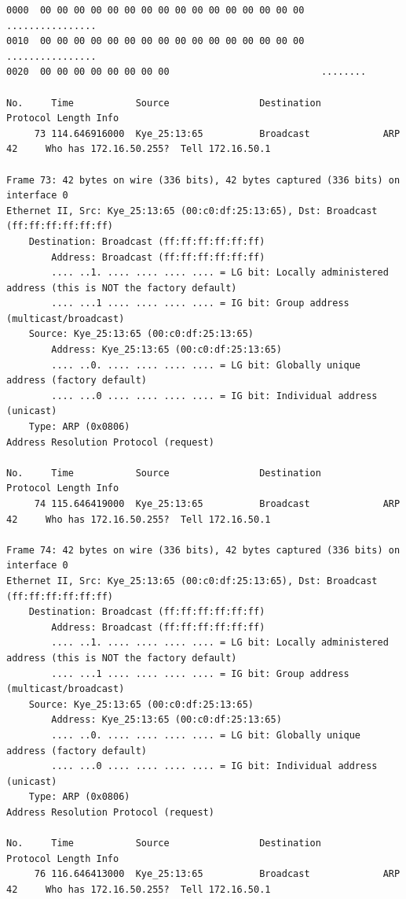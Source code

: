 \documentclass[a4paper,11pt]{article}
\begin{document}
\begin{lstlisting}
0000  00 00 00 00 00 00 00 00 00 00 00 00 00 00 00 00   ................
0010  00 00 00 00 00 00 00 00 00 00 00 00 00 00 00 00   ................
0020  00 00 00 00 00 00 00 00                           ........

No.     Time           Source                Destination           Protocol Length Info
     73 114.646916000  Kye_25:13:65          Broadcast             ARP      42     Who has 172.16.50.255?  Tell 172.16.50.1

Frame 73: 42 bytes on wire (336 bits), 42 bytes captured (336 bits) on interface 0
Ethernet II, Src: Kye_25:13:65 (00:c0:df:25:13:65), Dst: Broadcast (ff:ff:ff:ff:ff:ff)
    Destination: Broadcast (ff:ff:ff:ff:ff:ff)
        Address: Broadcast (ff:ff:ff:ff:ff:ff)
        .... ..1. .... .... .... .... = LG bit: Locally administered address (this is NOT the factory default)
        .... ...1 .... .... .... .... = IG bit: Group address (multicast/broadcast)
    Source: Kye_25:13:65 (00:c0:df:25:13:65)
        Address: Kye_25:13:65 (00:c0:df:25:13:65)
        .... ..0. .... .... .... .... = LG bit: Globally unique address (factory default)
        .... ...0 .... .... .... .... = IG bit: Individual address (unicast)
    Type: ARP (0x0806)
Address Resolution Protocol (request)

No.     Time           Source                Destination           Protocol Length Info
     74 115.646419000  Kye_25:13:65          Broadcast             ARP      42     Who has 172.16.50.255?  Tell 172.16.50.1

Frame 74: 42 bytes on wire (336 bits), 42 bytes captured (336 bits) on interface 0
Ethernet II, Src: Kye_25:13:65 (00:c0:df:25:13:65), Dst: Broadcast (ff:ff:ff:ff:ff:ff)
    Destination: Broadcast (ff:ff:ff:ff:ff:ff)
        Address: Broadcast (ff:ff:ff:ff:ff:ff)
        .... ..1. .... .... .... .... = LG bit: Locally administered address (this is NOT the factory default)
        .... ...1 .... .... .... .... = IG bit: Group address (multicast/broadcast)
    Source: Kye_25:13:65 (00:c0:df:25:13:65)
        Address: Kye_25:13:65 (00:c0:df:25:13:65)
        .... ..0. .... .... .... .... = LG bit: Globally unique address (factory default)
        .... ...0 .... .... .... .... = IG bit: Individual address (unicast)
    Type: ARP (0x0806)
Address Resolution Protocol (request)

No.     Time           Source                Destination           Protocol Length Info
     76 116.646413000  Kye_25:13:65          Broadcast             ARP      42     Who has 172.16.50.255?  Tell 172.16.50.1


\end{lstlisting}
\end{document}
